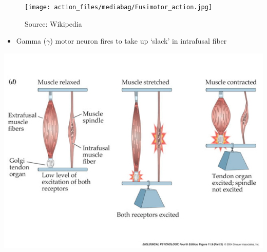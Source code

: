 \documentclass[
  letterpaper,
  DIV=11,
  numbers=noendperiod]{scrartcl}
\providecommand{\tightlist}{%
  \setlength{\itemsep}{0pt}\setlength{\parskip}{0pt}}\usepackage{longtable,booktabs,array}
\begin{document}
\begin{figure}[H]

{\centering \texttt{[image: action\_files/mediabag/Fusimotor\_action.jpg]}

}

\caption{Source: Wikipedia}

\end{figure}%

\begin{itemize}
\tightlist
\item
  Gamma (\(\gamma\)) motor neuron fires to take up `slack' in intrafusal
  fiber
\end{itemize}

\includegraphics{../include/img/intrafusal-extrafusal-fibers.jpg}
\end{document}
